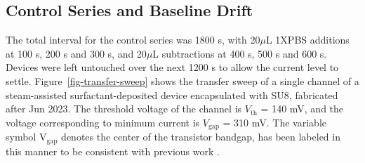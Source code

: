 \documentclass[
  a4paper,
]{scrbook}
\begin{document}
\hypertarget{sec-baseline-drift}{%
\subsection{Control Series and Baseline
Drift}\label{sec-baseline-drift}}

The total interval for the control series was 1800 s, with 20\(\mu\)L
1XPBS additions at 100 s, 200 s and 300 s, and 20\(\mu\)L subtractions
at 400 s, 500 s and 600 s. Devices were left untouched over the next
1200 s to allow the current level to settle.
Figure~\ref{fig-transfer-sweep} shows the transfer sweep of a single
channel of a steam-assisted surfactant-deposited device encapsulated
with SU8, fabricated after Jun 2023. The threshold voltage of the
channel is \(V_{\textrm{th}}\) = 140 mV, and the voltage corresponding
to minimum current is \(V_{\textrm{gap}}\) = 310 mV. The variable symbol
V\(_{\textrm{gap}}\) denotes the center of the transistor bandgap, has
been labeled in this manner to be consistent with previous work
\autocite{Heller2009}.
\end{document}
